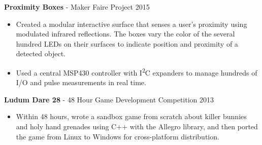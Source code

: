 \documentclass[10pt]{article}
\begin{document}
\begin{adjustwidth}{16pt}{0pt}
\vspace{8pt}
\noindent\textbf{Proximity Boxes} - Maker Faire Project 
\hfill 2015
\begin{itemize}
	\setlength\itemsep{0pt}
	\item Created a modular interactive surface that senses a user's proximity
	using modulated infrared reflections. The boxes vary the color of the
	several hundred LEDs on their surfaces to indicate position and proximity of a
	detected object.
	\item Used a central MSP430 controller with I\textsuperscript{2}C expanders to
	manage hundreds of I/O and pulse measurements in real time.
\end{itemize}


\vspace{8pt}
\noindent\textbf{Ludum Dare 28} - 48 Hour Game Development Competition
\hfill 2013
\begin{itemize}
	\setlength\itemsep{0pt}
	\item Within 48 hours, wrote a sandbox game from scratch about killer bunnies
	and holy hand grenades using C++ with the Allegro library, and then ported the
	game from Linux to Windows for cross-platform distribution.
\end{itemize}


\end{adjustwidth}
\end{document}

